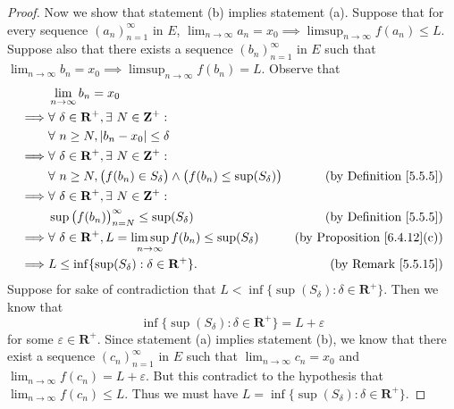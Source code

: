 \begin{proof}
    Now we show that statement (b) implies statement (a).
    Suppose that for every sequence \((a_n)_{n = 1}^\infty\) in \(E\), \(\lim_{n \to \infty} a_n = x_0 \implies \limsup_{n \to \infty} f(a_n) \leq L\).
    Suppose also that there exists a sequence \((b_n)_{n = 1}^\infty\) in \(E\) such that \(\lim_{n \to \infty} b_n = x_0 \implies \limsup_{n \to \infty} f(b_n) = L\).
    Observe that
    \begin{align*}
                 & \lim_{n \to \infty} b_n = x_0                                                                                                             \\
        \implies & \forall\ \delta \in \mathbf{R}^+, \exists\ N \in \mathbf{Z}^+ :                                                                           \\
                 & \forall\ n \geq N, \abs*{b_n - x_0} \leq \delta                                                                                           \\
        \implies & \forall\ \delta \in \mathbf{R}^+, \exists\ N \in \mathbf{Z}^+ :                                                                           \\
                 & \forall\ n \geq N, \big(f(b_n) \in S_{\delta}\big) \land \big(f(b_n) \leq \sup(S_{\delta})\big) & \text{(by Definition \ref{5.5.5})}      \\
        \implies & \forall\ \delta \in \mathbf{R}^+, \exists\ N \in \mathbf{Z}^+ :                                                                           \\
                 & \sup\big(f(b_n)\big)_{n = N}^\infty \leq \sup(S_{\delta})                                       & \text{(by Definition \ref{5.5.5})}      \\
        \implies & \forall\ \delta \in \mathbf{R}^+, L = \limsup_{n \to \infty} f(b_n) \leq \sup(S_{\delta})       & \text{(by Proposition \ref{6.4.12}(c))} \\
        \implies & L \leq \inf\{\sup(S_{\delta}) : \delta \in \mathbf{R}^+\}.                                      & \text{(by Remark \ref{5.5.15})}
    \end{align*}
    Suppose for sake of contradiction that \(L < \inf\{\sup(S_\delta) : \delta \in \mathbf{R}^+\}\).
    Then we know that
    \[
        \inf\{\sup(S_\delta) : \delta \in \mathbf{R}^+\} = L + \varepsilon
    \]
    for some \(\varepsilon \in \mathbf{R}^+\).
    Since statement (a) implies statement (b), we know that there exist a sequence \((c_n)_{n = 1}^\infty\) in \(E\) such that \(\lim_{n \to \infty} c_n = x_0\) and \(\lim_{n \to \infty} f(c_n) = L + \varepsilon\).
    But this contradict to the hypothesis that \(\lim_{n \to \infty} f(c_n) \leq L\).
    Thus we must have \(L = \inf\{\sup(S_{\delta}) : \delta \in \mathbf{R}^+\}\).
\end{proof}


